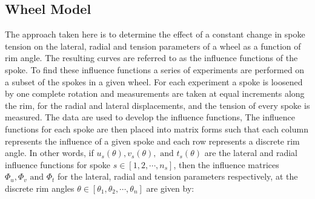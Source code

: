 \documentclass[journal]{IEEEtran}
\begin{document}
\subsection{Wheel Model}
The approach taken here is to determine the effect of a constant change in spoke tension on the lateral, radial and tension parameters of a wheel as a function of rim angle.  The resulting curves are referred to as the influence functions of the spoke. To find these influence functions a series of experiments are performed on a subset of the spokes in a given wheel.  For each experiment a spoke is loosened by one complete rotation and measurements are taken at equal increments along the rim, for the radial and lateral displacements, and the tension of every spoke is measured. The data are used to develop the influence functions, The influence functions for each spoke are then placed into matrix forms such that each column represents the influence of a given spoke and each row represents a discrete rim angle.  In other words, if $u_s (\theta), v_s(\theta), \text{ and }t_s(\theta)$ are the lateral and radial influence functions for spoke $s \in [1,2, \cdots , n_s]$, then the influence matrices $\Phi_u, \Phi_v \text{ and } \Phi_t$  for the lateral, radial and tension parameters respectively, at the discrete rim angles $\theta \in [\theta_1,\theta_2,\cdots, \theta_n]$ are given by:
\end{document}
